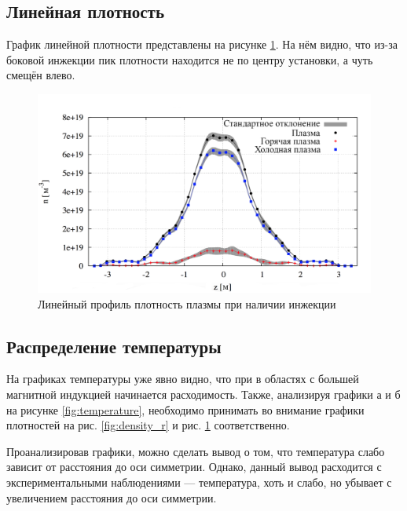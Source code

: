 \subsection{Линейная плотность}

График линейной плотности представлены на рисунке \ref{fig:density_z}. На нём видно, что из-за боковой инжекции пик плотности находится не по центру установки, а чуть смещён влево.

\begin{figure}[h!]
	\center
	\includegraphics[width=1.\linewidth]{fig/ch5/density_z.png}
	\caption{Линейный профиль плотность плазмы при наличии инжекции}
	\label{fig:density_z}
\end{figure}

\subsection{Распределение температуры}

На графиках температуры уже явно видно, что при в областях с большей магнитной индукцией начинается расходимость. Также, анализируя графики а и б на рисунке \ref{fig:temperature}, необходимо принимать во внимание графики плотностей на рис. \ref{fig:density_r} и рис. \ref{fig:density_z} соответственно.

Проанализировав графики, можно сделать вывод о том, что температура слабо зависит от расстояния до оси симметрии. Однако, данный вывод расходится с экспериментальными наблюдениями --- температура, хоть и слабо, но убывает с увеличением расстояния до оси симметрии.

